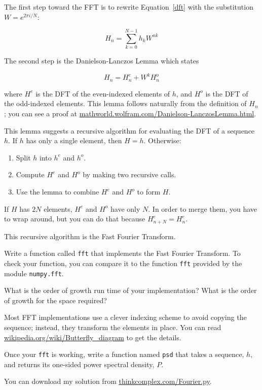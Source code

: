 \documentclass[10pt]{book}
\begin{document}
The first step toward the FFT is to rewrite Equation~\ref{dft}
with the substitution $W = e^{2 \pi i/N}$:

\begin{equation}
H_n = \sum_{k=0}^{N-1} h_k W^{n k}
\end{equation}

The second step is the Danielson-Lanczos Lemma which states

\[ H_n = H^e_n + W^k H^o_n \]

where $H^e$ is the DFT of the even-indexed elements
of $h$, and $H^o$ is the DFT of the odd-indexed elements.
This lemma follows naturally from the definition of $H_n$; you can see
a proof at \url{mathworld.wolfram.com/Danielson-LanczosLemma.html}.

This lemma suggests a recursive algorithm for evaluating the DFT
of a sequence $h$.  If  $h$ has only a single element, then $H=h$.
Otherwise:

\begin{enumerate}

\item Split $h$ into $h^e$ and $h^o$.

\item Compute $H^e$ and $H^o$ by making two recursive calls.

\item Use the lemma to combine $H^e$ and $H^o$ to form $H$.

\end{enumerate}

If $H$ has $2N$ elements, $H^e$ and $H^o$ have only $N$.
In order to merge them, you have to wrap around, but you
can do that because $H^e_{n+N} = H^e_{n}$.

This recursive algorithm is the Fast Fourier Transform.

\begin{ex}

Write a function called {\tt fft} that implements
the Fast Fourier Transform.  To check your function, you
can compare it to the function {\tt fft} provided by
the module {\tt numpy.fft}.

What is the order of growth run time of your implementation?
What is the order of growth for the space required?

Most FFT implementations use a clever indexing scheme to avoid copying
the sequence; instead, they transform the elements in place.  You can
read \url{wikipedia.org/wiki/Butterfly_diagram} to get the details.

Once your {\tt fft} is working, write a function named
{\tt psd} that takes a sequence, $h$, and returns its
one-sided power spectral density, $P$.

You can download my solution from \url{thinkcomplex.com/Fourier.py}.

\end{ex}
\end{document}
